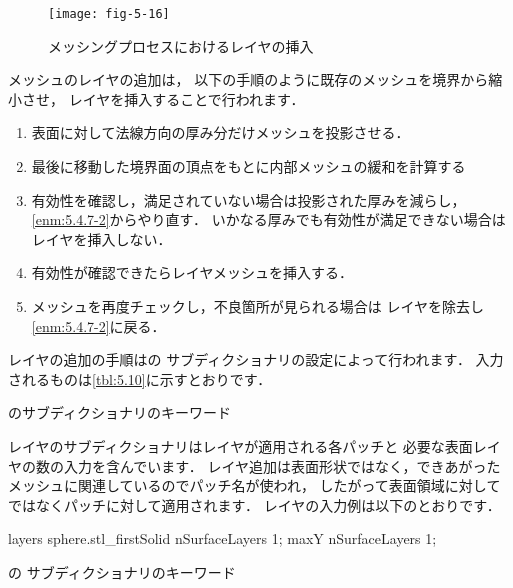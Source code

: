 \begin{figure}[ht]
 \texttt{[image: fig-5-16]}
 \caption{メッシングプロセスにおけるレイヤの挿入}
 \label{fig:5.16}
\end{figure}


メッシュのレイヤの追加は，
以下の手順のように既存のメッシュを境界から縮小させ，
レイヤを挿入することで行われます．
\begin{enumerate}
 \item 表面に対して法線方向の厚み分だけメッシュを投影させる．
 \item\label{enm:5.4.7-2}
      最後に移動した境界面の頂点をもとに内部メッシュの緩和を計算する
 \item 有効性を確認し，満足されていない場合は投影された厚みを減らし，
       \ref{enm:5.4.7-2}からやり直す．
       いかなる厚みでも有効性が満足できない場合はレイヤを挿入しない．
 \item 有効性が確認できたらレイヤメッシュを挿入する．
 \item メッシュを再度チェックし，不良箇所が見られる場合は
       レイヤを除去し\ref{enm:5.4.7-2}に戻る．
\end{enumerate}

レイヤの追加の手順はの
サブディクショナリの設定によって行われます．
入力されるものは\autoref{tbl:5.10}に示すとおりです．


\begin{table}[ht]
 
 \caption{のサブディクショナリのキーワード}
 \label{tbl:5.10}
\end{table}


レイヤのサブディクショナリはレイヤが適用される各パッチと
必要な表面レイヤの数の入力を含んでいます．
レイヤ追加は表面形状ではなく，できあがったメッシュに関連しているのでパッチ名が使われ，
したがって表面領域に対してではなくパッチに対して適用されます．
レイヤの入力例は以下のとおりです．
\begin{OFverbatim}[file]
 layers
  {
      sphere.stl_firstSolid
      {
          nSurfaceLayers 1;
      }
      maxY
      {
          nSurfaceLayers 1;
      }
  }
\end{OFverbatim}


\begin{table}[ht]
 
 \caption{の
 サブディクショナリのキーワード}
 \label{tbl:5.11}
\end{table}


